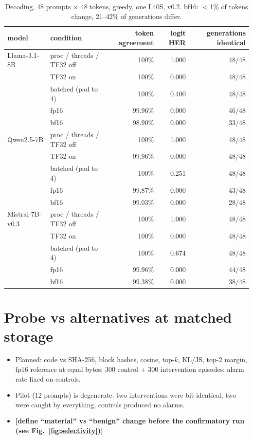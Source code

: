 \documentclass{article}
\newcommand{\todo}[1]{\textcolor{sTwo}{\textbf{[#1]}}}
\begin{document}
\begin{table}[h]\centering\footnotesize
\caption{Decoding, 48 prompts $\times$ 48 tokens, greedy, one L40S, v0.2. bf16: $<$1\% of tokens change, 21--42\% of generations differ.}
\begin{tabular}{llrrr}
\toprule
model & condition & token agreement & logit HER & generations identical \\
\midrule
Llama-3.1-8B & proc / threads / TF32 off & 100\% & 1.000 & 48/48 \\
 & TF32 on & 100\% & 0.000 & 48/48 \\
 & batched (pad to 4) & 100\% & 0.400 & 48/48 \\
 & fp16 & 99.96\% & 0.000 & 46/48 \\
 & bf16 & 98.90\% & 0.000 & 33/48 \\
Qwen2.5-7B & proc / threads / TF32 off & 100\% & 1.000 & 48/48 \\
 & TF32 on & 99.96\% & 0.000 & 48/48 \\
 & batched (pad to 4) & 100\% & 0.251 & 48/48 \\
 & fp16 & 99.87\% & 0.000 & 43/48 \\
 & bf16 & 99.03\% & 0.000 & 28/48 \\
Mistral-7B-v0.3 & proc / threads / TF32 off & 100\% & 1.000 & 48/48 \\
 & TF32 on & 100\% & 0.000 & 48/48 \\
 & batched (pad to 4) & 100\% & 0.674 & 48/48 \\
 & fp16 & 99.96\% & 0.000 & 44/48 \\
 & bf16 & 99.38\% & 0.000 & 38/48 \\
\bottomrule
\end{tabular}
\end{table}

\section{Probe vs alternatives at matched storage}\label{app:matched}
\begin{itemize}
  \item Planned: code vs SHA-256, block hashes, cosine, top-$k$, KL/JS, top-2 margin, fp16 reference at equal bytes; 300 control + 300 intervention episodes; alarm rate fixed on controls.
  \item Pilot (12 prompts) is degenerate: two interventions were bit-identical, two were caught by everything, controls produced no alarms.
  \item \todo{define ``material'' vs ``benign'' change before the confirmatory run (see Fig.~\ref{fig:selectivity})}
\end{itemize}
\end{document}
